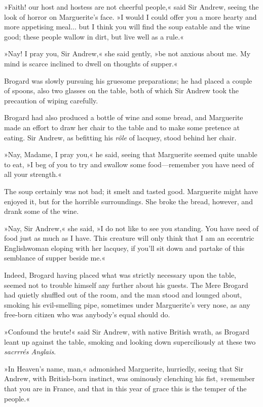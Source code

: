 »Faith! our host and hostess are not cheerful people,« said Sir Andrew, seeing the look of horror on Marguerite's face. »I would I could offer you a more hearty and more appetising meal... but I think you will find the soup eatable and the wine good; these people wallow in dirt, but live well as a rule.«

»Nay! I pray you, Sir Andrew,« she said gently, »be not anxious about me. My mind is scarce inclined to dwell on thoughts of supper.«

Brogard was slowly pursuing his gruesome preparations; he had placed a couple of spoons, also two glasses on the table, both of which Sir Andrew took the precaution of wiping carefully.

Brogard had also produced a bottle of wine and some bread, and Marguerite made an effort to draw her chair to the table and to make some pretence at eating. Sir Andrew, as befitting his \textit{rôle} of lacquey, stood behind her chair.

»Nay, Madame, I pray you,« he said, seeing that Marguerite seemed quite unable to eat, »I beg of you to try and swallow some food\allowbreak---\allowbreak remember you have need of all your strength.«

The soup certainly was not bad; it smelt and tasted good. Marguerite might have enjoyed it, but for the horrible surroundings. She broke the bread, however, and drank some of the wine.

»Nay, Sir Andrew,« she said, »I do not like to see you standing. You have need of food just as much as I have. This creature will only think that I am an eccentric Englishwoman eloping with her lacquey, if you'll sit down and partake of this semblance of supper beside me.«

Indeed, Brogard having placed what was strictly necessary upon the table, seemed not to trouble himself any further about his guests. The Mere Brogard had quietly shuffled out of the room, and the man stood and lounged about, smoking his evil-smelling pipe, sometimes under Marguerite's very nose, as any free-born citizen who was anybody's equal should do.

»Confound the brute!« said Sir Andrew, with native British wrath, as Brogard leant up against the table, smoking and looking down superciliously at these two \textit{sacrrrés Anglais}.

»In Heaven's name, man,« admonished Marguerite, hurriedly, seeing that Sir Andrew, with British-born instinct, was ominously clenching his fist, »remember that you are in France, and that in this year of grace this is the temper of the people.«

